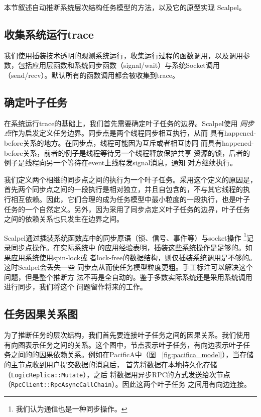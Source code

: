 本节叙述自动推断系统层次结构任务模型的方法，以及它的原型实现
\pozhehao{}Scalpel。

\subsection{收集系统运行trace}

我们使用插装技术透明的观测系统运行，收集运行过程的函数调用，以及调用参
数，包括应用层函数和系统同步函数（signal/wait）与系统Socket调用
（send/recv）。默认所有的函数调用都会被收集到trace。


\subsection{确定叶子任务}

在系统运行trace的基础上，我们首先需要确定叶子任务的边界。Scalpel使用
\emph{同步点}作为启发定义任务边界。同步点是两个线程同步相互执行，从而
具有happened-before关系的地方。在同步点，线程可能因为互斥或者相互协同
而具有happened-before关系，前者的例子是线程等待另一个线程释放保护共享
资源的锁，后者的例子是线程向另一个等待在event上线程发signal消息，通知
对方继续执行。

我们定义两个相继的同步点之间的执行为一个叶子任务。采用这个定义的原因是，
首先两个同步点之间的一段执行是相对独立，并且自包含的，不与其它线程的执
行相互依赖。因此，它们合理的成为任务模型中最小粒度的一段执行，也是叶子
任务的一个自然定义。另外，因为采用了同步点定义叶子任务的边界，叶子任务
之间的依赖关系也只发生在边界之间。

Scalpel通过插装系统函数库中的同步原语（锁、信号、事件等）与socket操作
\footnote{我们认为通信也是一种同步操作。}记录同步点操作。在实际系统中
的应用经验表明，插装这些系统操作是足够的。如果应用系统使用spin-lock或
者lock-free的数据结构，则仅插装系统调用是不够的。这时Scalpel会丢失一些
同步点从而使任务模型粒度更粗。手工标注可以解决这个问题，但是整个推断方
法不再是全自动的。鉴于多数实际系统还是采用系统调用进行同步，我们将这个
问题留作将来的工作。

\subsection{任务因果关系图}


为了推断任务的层次结构，我们首先要连接叶子任务之间的因果关系。我们使用
有向图表示任务之间的关系。这个图中，节点表示叶子任务，有向边表示叶子任
务之间的的因果依赖关系。例如在PacificA中（图
~\ref{fig:pacifica_model}），当存储的主节点收到用户提交数据的消息后，
首先将数据在本地持久化存储（\texttt{Logic\-Replica\-::Mutate}），之后
将数据用异步RPC的方式发送给次节点
（\texttt{Rpc\-Client\-::RpcAsync\-Call\-Chain}）。因此这两个叶子任务
之间用有向边连接。

